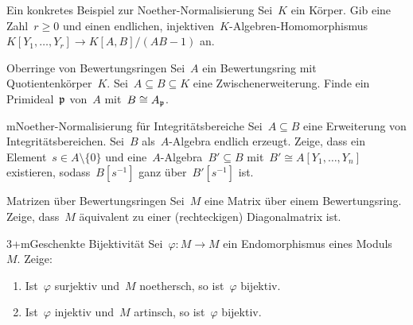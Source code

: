 \documentclass{uebblatt}
\begin{document}

\begin{aufgabe}{4}{Ein konkretes Beispiel zur Noether-Normalisierung}
Sei~$K$ ein Körper. Gib eine Zahl~$r \geq 0$ und einen endlichen,
injektiven~$K$-Algebren-Homomorphismus~$K[Y_1,\ldots,Y_r] \to K[A,B]/(AB-1)$
an.
\end{aufgabe}

\begin{aufgabe}{3}{Oberringe von Bewertungsringen}
Sei~$A$ ein Bewertungsring mit Quotientenkörper~$K$. Sei~$A \subseteq B
\subseteq K$ eine Zwischenerweiterung. Finde ein Primideal~$\mathfrak{p}$ von~$A$
mit~$B \cong A_{\mathfrak{p}}$.
\end{aufgabe}

\begin{aufgabe}{m}{Noether-Normalisierung für Integritätsbereiche}
Sei~$A \subseteq B$ eine Erweiterung von Integritätsbereichen. Sei~$B$
als~$A$-Algebra endlich erzeugt. Zeige, dass ein Element~$s \in A \setminus
\{0\}$ und eine~$A$-Algebra~$B' \subseteq B$ mit~$B' \cong A[Y_1,\ldots,Y_n]$
existieren, sodass~$B[s^{-1}]$ ganz über~$B'[s^{-1}]$ ist.
\end{aufgabe}

\begin{aufgabe}{2}{Matrizen über Bewertungsringen}
Sei~$M$ eine Matrix über einem Bewertungsring. Zeige, dass~$M$ äquivalent zu
einer (recht\-eckigen) Diagonalmatrix ist.
\end{aufgabe}

\begin{aufgabe}{3+m}{Geschenkte Bijektivität}
Sei~$\varphi : M \to M$ ein Endomorphismus eines Moduls~$M$. Zeige:
\begin{enumerate}
\item Ist~$\varphi$ surjektiv und~$M$ noethersch, so ist~$\varphi$ bijektiv.
\item Ist~$\varphi$ injektiv und~$M$ artinsch, so ist~$\varphi$ bijektiv.
\end{enumerate}
\end{aufgabe}
\end{document}
